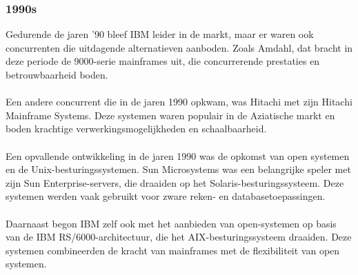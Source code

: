 \subsubsection{1990s}
\label{sec:1990s}
Gedurende de jaren '90 bleef IBM leider in de markt, maar er waren ook concurrenten die uitdagende alternatieven aanboden. Zoals Amdahl, dat bracht in deze periode de 9000-serie mainframes uit, die concurrerende prestaties en betrouwbaarheid boden. \autocite{Cerruzi2003}
\\ \\
Een andere concurrent die in de jaren 1990 opkwam, was Hitachi met zijn Hitachi Mainframe Systems. Deze systemen waren populair in de Aziatische markt en boden krachtige verwerkingsmogelijkheden en schaalbaarheid. \autocite{Cerruzi2003}
\\ \\
Een opvallende ontwikkeling in de jaren 1990 was de opkomst van open systemen en de Unix-besturingssystemen. Sun Microsystems was een belangrijke speler met zijn Sun Enterprise-servers, die draaiden op het Solaris-besturingssysteem. Deze systemen werden vaak gebruikt voor zware reken- en databasetoepassingen. \autocite{Cerruzi2003}
\\ \\
Daarnaast begon IBM zelf ook met het aanbieden van open-systemen op basis van de IBM RS/6000-architectuur, die het AIX-besturingssysteem draaiden. Deze systemen combineerden de kracht van mainframes met de flexibiliteit van open systemen. \autocite{Cerruzi2003}
\\ \\
